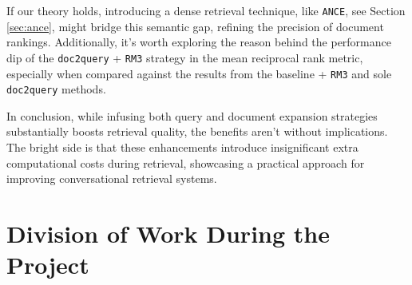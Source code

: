 \documentclass[sigconf]{acmart}
\begin{document}
If our theory holds, introducing a dense retrieval technique, like \texttt{ANCE}, see Section \ref{sec:ance}, might bridge this semantic gap, refining the precision of document rankings. Additionally, it's worth exploring the reason behind the performance dip of the \texttt{doc2query} + \texttt{RM3} strategy in the mean reciprocal rank metric, especially when compared against the results from the baseline + \texttt{RM3} and sole \texttt{doc2query} methods.

In conclusion, while infusing both query and document expansion strategies substantially boosts retrieval quality, the benefits aren't without implications. The bright side is that these enhancements introduce insignificant extra computational costs during retrieval, showcasing a practical approach for improving conversational retrieval systems.








\newpage
\appendix
\section{Division of Work During the Project}
\end{document}
